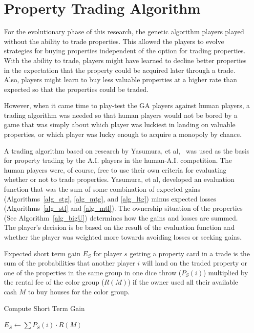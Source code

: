 \section{Property Trading Algorithm} \label{5_trade_property}

For the evolutionary phase of this research, the genetic algorithm players
played without the ability to trade properties. This allowed the players to
evolve strategies for buying properties independent of the option for trading
properties. With the ability to trade, players might have learned to decline
better properties in the expectation that the property could be acquired later
through a trade. Also, players might learn to buy less valuable properties at a
higher rate than expected so that the properties could be traded.

However, when it came time to play-test the GA players against human players, a
trading algorithm was needed so that human players would not be bored by a game
that was simply about which player was luckiest in landing on valuable
properties, or which player was lucky enough to acquire a monopoly by chance.

A trading algorithm based on research by Yasumura, et
al,~\cite{Yasumura2001Negotiate} was used as the basis for property trading by
the A.I. players in the human-A.I. competition. The human players were, of
course, free to use their own criteria for evaluating whether or not to trade
properties. Yasumura, et al,
developed an evaluation function that was the sum of some combination of
expected gains (Algorithms~\ref{alg_stg}, \ref{alg_mtg}, and \ref{alg_ltg})
minus expected losses (Algorithms~\ref{alg_stl} and \ref{alg_mtl}). The
ownership situation of the properties (See Algorithm~\ref{alg_bigU}) determines
how the gains and losses are summed. The player's decision is be based on the
result of the evaluation function and whether the player was weighted more
towards avoiding losses or seeking gains.

Expected short term gain \(E_S\) for player \(s\) getting a property card in a
trade is the sum of the probabilities that another player \(i\) will land on the
traded property or one of the properties in the same group in one dice throw
(\(P_S(i)\)) multiplied by the rental fee of the color group (\(R(M)\)) if the
owner used all their available cash \(M\) to buy houses for the color group.
\begin{algorithm} 
\caption{Compute Short Term Gain}
\label{alg_stg}
\begin{algorithmic}
   \STATE $E_S \gets \sum P_S(i) \cdot R(M)$ 
\end{algorithmic}
\end{algorithm}

